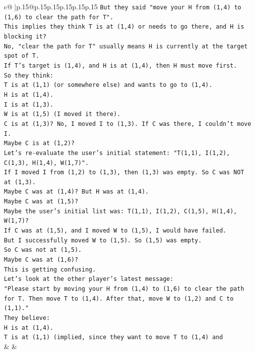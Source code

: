 \documentclass{article}
\begin{document}
{\begin{supertabular}{c@{$\;$}|p{.15\linewidth}@{}p{.15\linewidth}p{.15\linewidth}p{.15\linewidth}p{.15\linewidth}p{.15\linewidth}}
{{{\texttt{But they said "move your H from (1,4) to (1,6) to clear the path for T".} \\
\texttt{This implies they think T is at (1,4) or needs to go there, and H is blocking it?} \\
\texttt{No, "clear the path for T" usually means H is currently at the target spot of T.} \\
\texttt{If T's target is (1,4), and H is at (1,4), then H must move first.} \\
\texttt{So they think:} \\
\texttt{T is at (1,1) (or somewhere else) and wants to go to (1,4).} \\
\texttt{H is at (1,4).} \\
\texttt{I is at (1,3).} \\
\texttt{W is at (1,5) (I moved it there).} \\
\texttt{C is at (1,3)? No, I moved I to (1,3). If C was there, I couldn't move I.} \\
\texttt{Maybe C is at (1,2)?} \\
\texttt{Let's re{-}evaluate the user's initial statement: "T(1,1), I(1,2), C(1,3), H(1,4), W(1,7)".} \\
\texttt{If I moved I from (1,2) to (1,3), then (1,3) was empty. So C was NOT at (1,3).} \\
\texttt{Maybe C was at (1,4)? But H was at (1,4).} \\
\texttt{Maybe C was at (1,5)?} \\
\texttt{Maybe the user's initial list was: T(1,1), I(1,2), C(1,5), H(1,4), W(1,7)?} \\
\texttt{If C was at (1,5), and I moved W to (1,5), I would have failed.} \\
\texttt{But I successfully moved W to (1,5). So (1,5) was empty.} \\
\texttt{So C was not at (1,5).} \\
\texttt{Maybe C was at (1,6)?} \\
\texttt{This is getting confusing.} \\
\texttt{Let's look at the other player's latest message:} \\
\texttt{"Please start by moving your H from (1,4) to (1,6) to clear the path for T. Then move T to (1,4). After that, move W to (1,2) and C to (1,1)."} \\
\texttt{They believe:} \\
\texttt{H is at (1,4).} \\
\texttt{T is at (1,1) (implied, since they want to move T to (1,4) and} \\
            }
        }
    }
    & & \\ \\


\end{supertabular}}
\end{document}
